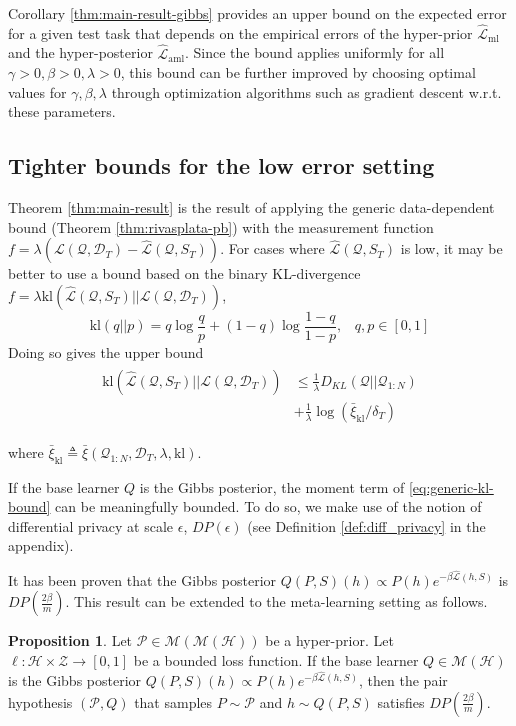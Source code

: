 \documentclass[letterpaper]{article} %
\theoremstyle{definition}
\newtheorem{proposition}[theorem]{Proposition}
\begin{document}
Corollary \ref{thm:main-result-gibbs} provides an upper bound on the expected error for a given test task that depends on the empirical errors of the hyper-prior $\hat{\mathcal{L}}_{\mathrm{ml}}$ and the hyper-posterior $\hat{\mathcal{L}}_{\mathrm{aml}}$. 
Since the bound applies uniformly for all $\gamma>0,\beta>0,\lambda>0$, this bound can be further improved by choosing optimal values for $\gamma, \beta, \lambda$ through optimization algorithms such as gradient descent w.r.t.\! these parameters.

\subsection{Tighter bounds for the low error setting}

Theorem \ref{thm:main-result} is the result of applying the generic data-dependent bound (Theorem \ref{thm:rivasplata-pb}) with the measurement function $f=\lambda(\mathcal{L}(\mathcal{Q},\mathcal{D}_T)-\hat{\mathcal{L}}(\mathcal{Q}, S_T))$. For cases where $\hat{\mathcal{L}}(\mathcal{Q}, S_T)$ is low, it may be better to use a bound based on the binary KL-divergence $f=\lambda \mathrm{kl}(\hat{\mathcal{L}}(\mathcal{Q}, S_T)||\mathcal{L}(\mathcal{Q},\mathcal{D}_T))$, 
$$
\mathrm{kl}(q||p)=q \log\frac{q}{p}+(1-q)\log\frac{1-q}{1-p},\;\;\; q,p\in[0, 1]
$$
Doing so gives the upper bound
    \begin{align} \label{eq:generic-kl-bound}
\begin{split}
\mathrm{kl}(\hat{\mathcal{L}}(\mathcal{Q}, S_T)||\mathcal{L}(\mathcal{Q},\mathcal{D}_T)) &\leq \frac{1}{\lambda} D_{KL}(\mathcal{Q}||\mathcal{Q}_{1:N})\\
&+\frac{1}{\lambda}\log\left (\bar{\xi}_{\mathrm{kl}}/\delta_T\right ) 
\end{split}
\end{align}

where $\bar{\xi}_{\mathrm{kl}}\triangleq \bar{\xi}(\mathcal{Q}_{1:N}, \mathcal{D}_T,\lambda, \mathrm{kl}) .$

If the base learner $Q$ is the Gibbs posterior, the moment term of  \eqref{eq:generic-kl-bound} can be meaningfully bounded. To do so, we make use of the notion of differential privacy at scale $\epsilon$, $DP(\epsilon)$ (see Definition \ref{def:diff_privacy} in the appendix).

It has been proven \citep{McSherry2007, Rivasplata2020} that the Gibbs posterior $Q(P, S)(h)\propto P(h)e^{-\beta\hat{\mathcal{L}}(h, S)}$ is $DP\left (\frac{2\beta}{m}\right )$.
This result can be extended to the meta-learning setting as follows. 
%
\begin{proposition} \label{thm:pair-is-dp}
	Let $\mathcal{P}\in \mathcal{M}(\mathcal{M}(\mathcal{H}))$ be a hyper-prior.
	Let $\ell:\mathcal{H}\times \mathcal{Z}\rightarrow [0,1]$ be a bounded loss function. If the base learner $Q\in \mathcal{M}(\mathcal{H})$ is the Gibbs posterior $Q(P, S)(h)\propto P(h)e^{-\beta\hat{\mathcal{L}}(h, S)}$, 
	then the pair hypothesis $(\mathcal{P}, Q)$ that samples $P\sim\mathcal{P}$ and $h\sim Q(P, S)$ satisfies $DP\left (\frac{2\beta}{m}\right )$.
\end{proposition}
\end{document}
